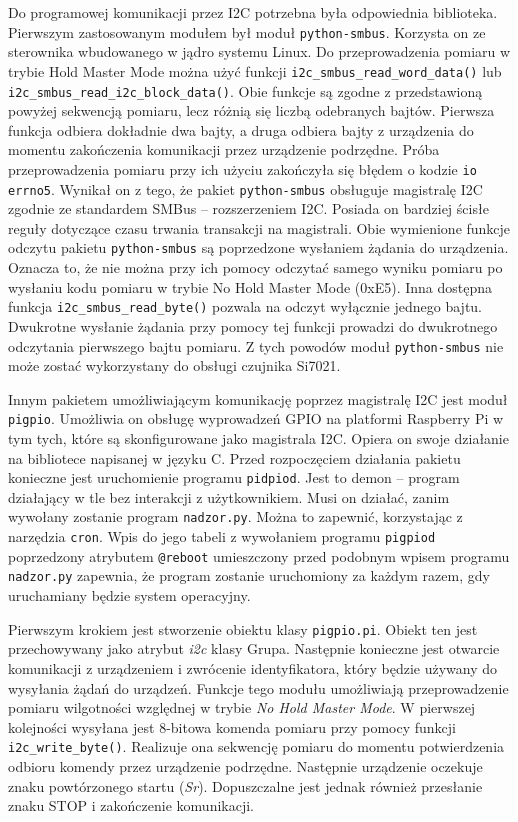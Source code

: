 \documentclass[a4paper,12pt,twoside]{article}
\begin{document}
Do programowej komunikacji przez I2C potrzebna była odpowiednia biblioteka. Pierwszym zastosowanym modułem był moduł \texttt{python-smbus}. Korzysta on ze sterownika wbudowanego w jądro systemu Linux. Do przeprowadzenia pomiaru w trybie Hold Master Mode można użyć funkcji \texttt{i2c{\_}smbus{\_}read{\_}word{\_}data()} \linebreak lub \texttt{i2c{\_}smbus{\_}read{\_}i2c{\_}block{\_}data()}. Obie funkcje są zgodne z przedstawioną powyżej sekwencją pomiaru, lecz różnią się liczbą odebranych bajtów. Pierwsza funkcja odbiera dokładnie dwa bajty, a druga odbiera bajty z urządzenia do momentu zakończenia komunikacji przez urządzenie podrzędne\cite{smbus}. Próba przeprowadzenia pomiaru przy ich użyciu zakończyła się błędem o kodzie \texttt{io errno5}. Wynikał on z tego, że pakiet \texttt{python-smbus} obsługuje magistralę I2C zgodnie ze standardem SMBus -- rozszerzeniem I2C. Posiada on bardziej ścisłe reguły dotyczące czasu trwania transakcji na magistrali. Obie wymienione funkcje odczytu pakietu \texttt{python-smbus} są poprzedzone wysłaniem żądania do urządzenia. Oznacza to, że nie można przy ich pomocy odczytać samego wyniku pomiaru po wysłaniu kodu pomiaru w trybie No Hold Master Mode (0xE5). Inna dostępna funkcja \texttt{i2c{\_}smbus{\_}read{\_}byte()} pozwala na odczyt wyłącznie jednego bajtu. Dwukrotne wysłanie żądania przy pomocy tej funkcji prowadzi do dwukrotnego odczytania pierwszego bajtu pomiaru. Z tych powodów moduł \texttt{python-smbus} nie może zostać wykorzystany do obsługi czujnika Si7021. 

Innym pakietem umożliwiającym komunikację poprzez magistralę I2C jest moduł \texttt{pigpio}. Umożliwia on obsługę wyprowadzeń GPIO na platformi Raspberry Pi w tym tych, które są skonfigurowane jako magistrala I2C. Opiera on swoje działanie na bibliotece napisanej w języku C. Przed rozpoczęciem działania pakietu konieczne jest uruchomienie programu \texttt{pidpiod}. Jest to demon -- program działający w tle bez interakcji z użytkownikiem. Musi on działać, zanim wywołany zostanie program \texttt{nadzor.py}. Można to zapewnić, korzystając z narzędzia \texttt{cron}. Wpis do jego tabeli z wywołaniem programu \texttt{pigpiod} poprzedzony atrybutem \texttt{@reboot} umieszczony przed podobnym wpisem programu \texttt{nadzor.py} zapewnia, że program zostanie uruchomiony za każdym razem, gdy uruchamiany będzie system operacyjny.

Pierwszym krokiem jest stworzenie obiektu klasy \texttt{pigpio.pi}. Obiekt ten jest przechowywany jako atrybut \textit{i2c} klasy Grupa. Następnie konieczne jest otwarcie komunikacji z urządzeniem i zwrócenie identyfikatora, który będzie używany do wysyłania żądań do urządzeń. Funkcje tego modułu umożliwiają przeprowadzenie pomiaru wilgotności względnej w trybie \textit{No Hold Master Mode}. W pierwszej kolejności wysyłana jest 8-bitowa komenda pomiaru przy pomocy funkcji \texttt{i2c{\_}write{\_}byte()}. Realizuje ona sekwencję pomiaru do momentu potwierdzenia odbioru komendy przez urządzenie podrzędne. Następnie urządzenie oczekuje znaku powtórzonego startu (\textit{Sr}). Dopuszczalne jest jednak również przesłanie znaku STOP i zakończenie komunikacji.
\end{document}
